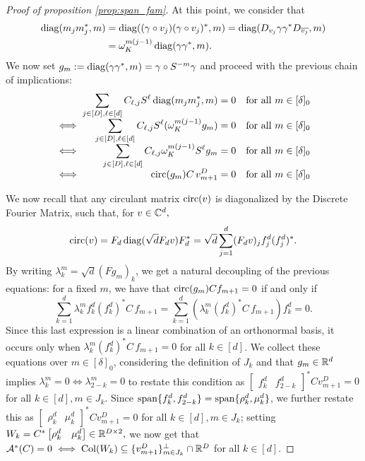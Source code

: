 \begin{proof}[Proof of proposition \ref{prop:span_fam}]
  At this point, we consider that \begin{align} \operatorname{diag}(m_j m_j^*, m) &= \operatorname{diag}((\gamma \circ v_j) (\gamma \circ v_j)^*, m) = \operatorname{diag}(D_{v_j} \gamma \gamma^* D_{\overline{v_j}}, m) \\ &= \omega_K^{m(j - 1)} \operatorname{diag}(\gamma \gamma^*, m). \label{eq:gam_diag}\end{align}  We now set $g_m := \operatorname{diag}(\gamma \gamma^*, m) = \gamma \circ S^{-m} \gamma$ and proceed with the previous chain of implications:
  \[\arraycolsep=1.4pt%
  \begin{array}{c>{\displaystyle}rcl@{\quad}r}
    & \sum_{j \in [D], \ell \in [d]} C_{\ell, j} S^{\ell} \diag(m_j m_j^*, m) & = & 0 & \text{for all} \ m \in [\delta]_0 \\
    \iff & \sum_{j \in [D], \ell \in [d]} C_{\ell, j} S^{\ell} (\omega_K^{m(j - 1)} g_m) & = & 0 & \text{for all} \ m \in [\delta]_0 \\
    \iff & \sum_{j \in [D], \ell \in [d]} C_{\ell, j} \omega_K^{m(j - 1)} S^{\ell} g_m & = & 0 & \text{for all} \ m \in [\delta]_0 \\
    \iff & \circop(g_m) C \, v^D_{m+1} & = & 0 & \text{for all} \ m \in [\delta]_0 \\
  \end{array}\]

  We now recall that any circulant matrix $\operatorname{circ}(v)$ is diagonalized by the Discrete Fourier Matrix, such that, for $v \in \mathbb{C}^d,$ \begin{equation} \operatorname{circ}(v) = F_d \operatorname{diag}(\sqrt{d} F_d v) F_d^* = \sqrt{d} \sum_{j = 1}^d (F_d v)_j f_j^d (f_j^d)^*. \label{eq:circ_dft_diag} \end{equation}  By writing $\lambda_k^m = \sqrt{d}(F g_m)_k$, we get a natural decoupling of the previous equations: for a fixed $m$, we have that $\operatorname{circ}(g_m) C f_{m + 1} = 0$ if and only if \[\sum_{k = 1}^d \lambda_k^m f_k^d (f_k^d)^* C \, f_{m + 1} = \sum_{k = 1}^d (\lambda_k^m (f_k^d)^* C \, f_{m + 1}) f_k^d = 0.\]  Since this last expression is a linear combination of an orthonormal basis, it occurs only when $\lambda_k^m (f_k^d)^* C \, f_{m + 1} = 0$ for all $k \in [d]$.  We collect these equations over $m \in [\delta]_0$, considering the definition of $J_k$ and that $g_m \in \mathbb{R}^d$ implies $\lambda_k^m = 0 \iff \lambda_{2 - k}^m = 0$ to restate this condition as $\begin{bmatrix} f_k^d & f_{2 - k}^d \end{bmatrix}^* C v^D_{m + 1} = 0$ for all $k \in [d], m \in J_k$.  Since $\operatorname{span}\{f_k^d, f_{2 - k}^d\} = \operatorname{span}\{\rho_k^d, \mu_k^d\}$, we further restate this as $\begin{bmatrix} \rho_k^d & \mu_k^d \end{bmatrix}^* C v_{m + 1}^D = 0$ for all $k \in [d], m \in J_k$; setting $W_k = C^* \begin{bmatrix} \rho_k^d & \mu_k^d \end{bmatrix} \in \mathbb{R}^{D \times 2},$ we now get that $\mathcal{A}^*(C) = 0 \iff \operatorname{Col}(W_k) \subseteq \{v_{m + 1}^D\}_{m \in J_k}^\perp \cap \mathbb{R}^D$ for all $k \in [d]$.


\end{proof}
